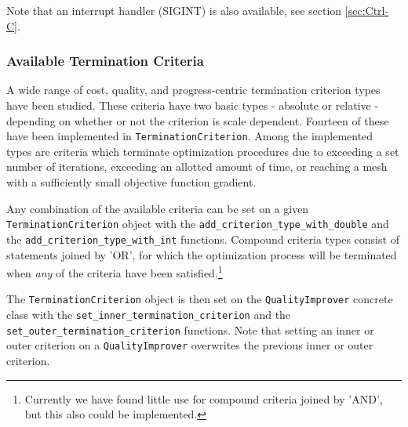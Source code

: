 Note that an interrupt handler (SIGINT) is also available, see section \ref{sec:Ctrl-C}. 

\subsubsection{Available Termination Criteria}
A wide range of cost, quality, 
and progress-centric termination
criterion types have been studied. These criteria have two basic types - 
absolute or relative - depending on whether or not the criterion is scale 
dependent.  Fourteen of these have been
implemented in \texttt{TerminationCriterion}.  Among the implemented
types are criteria which terminate optimization procedures due to
exceeding a set number of iterations, exceeding an allotted amount of
time, or reaching a mesh with a sufficiently small objective function
gradient.  

Any combination of the available criteria can be set on a given
\texttt{TerminationCriterion} object with the \texttt{add\_criterion\_type\_with\_double} and 
the \texttt{add\_criterion\_type\_with\_int} functions.  Compound criteria types consist
of statements joined by 'OR', for which 
the optimization process will be terminated when {\it any} of
the criteria have been satisfied.\footnote{Currently we have found little use
for compound criteria joined by 'AND', but this also could be implemented.}

The \texttt{TerminationCriterion} object is then set on the \texttt{QualityImprover} concrete class
with the \texttt{set\_inner\_termination\_criterion} and the \texttt{set\_outer\_termination\_criterion}
functions. Note that setting an inner or outer criterion on a \texttt{QualityImprover} overwrites
the previous inner or outer criterion.

